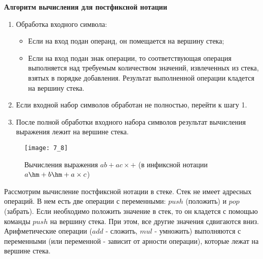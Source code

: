 \begin{center}
  \textbf{Алгоритм вычисления для постфиксной нотации}
\end{center}
\begin{enumerate}
  \item Обработка входного символа:
  \begin{itemize}
    \item Если на вход подан операнд, он помещается на вершину стека;
    \item Если на вход подан знак операции, то соответствующая операция выполняется над требуемым количеством значений, извлеченных из стека, взятых в порядке добавления. Результат выполненной операции кладется на вершину стека.
  \end{itemize}
  \item Если входной набор символов обработан не полностью, перейти к шагу 1.
  \item После полной обработки входного набора символов результат вычисления выражения лежит на вершине стека.
\end{enumerate}

\begin{figure}[h]
\centering
\texttt{[image: 7\_8]}
\caption{Вычисления выражения $ab+ac\times +$ (в инфиксной нотации $a\hm+b\hm+a\times c$)}
\end{figure}
Рассмотрим вычисление постфиксной нотации в стеке. Стек не имеет адресных операций. В нем есть две операции с переменными: $push$ (положить) и $pop$ (забрать). Если необходимо положить значение в стек, то он кладется с помощью команды $push$ на вершину стека. При этом, все другие значения сдвигаются вниз. Арифметические операции ($add$ - сложить, $mul$ - умножить) выполняются с переменными (или переменной - зависит от арности операции), которые лежат на вершине стека.